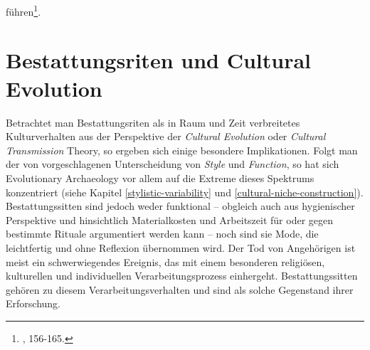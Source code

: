 \documentclass[openany,twoside,twocolumn]{book}
\let\rmarkdownfootnote\footnote%
\def\footnote{\protect\rmarkdownfootnote}
\begin{document}
führen\footnote{\textcite{hofmann_rituelle_2008}, 156-165.}.

\hypertarget{bestattungsriten-und-cultural-evolution}{%
\section{Bestattungsriten und Cultural Evolution}\label{bestattungsriten-und-cultural-evolution}}

Betrachtet man Bestattungsriten als in Raum und Zeit verbreitetes Kulturverhalten aus der Perspektive der \emph{Cultural Evolution} oder \emph{Cultural Transmission} Theory, so ergeben sich einige besondere Implikationen. Folgt man der von \textcite{dunnell1978style} vorgeschlagenen Unterscheidung von \emph{Style} und \emph{Function}, so hat sich Evolutionary Archaeology vor allem auf die Extreme dieses Spektrums konzentriert (siehe Kapitel \ref{stylistic-variability} und \ref{cultural-niche-construction}). Bestattungssitten sind jedoch weder funktional -- obgleich auch aus hygienischer Perspektive und hinsichtlich Materialkosten und Arbeitszeit für oder gegen bestimmte Rituale argumentiert werden kann -- noch sind sie Mode, die leichtfertig und ohne Reflexion übernommen wird. Der Tod von Angehörigen ist meist ein schwerwiegendes Ereignis, das mit einem besonderen religiösen, kulturellen und individuellen Verarbeitungsprozess einhergeht. Bestattungssitten gehören zu diesem Verarbeitungsverhalten und sind als solche Gegenstand ihrer Erforschung.
\end{document}
